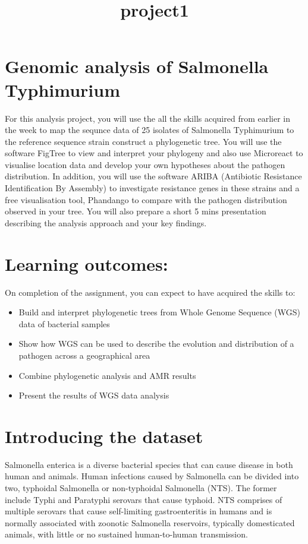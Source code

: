 \documentclass[11pt]{article}
\title{project1}
\providecommand{\tightlist}{%
      \setlength{\itemsep}{0pt}\setlength{\parskip}{0pt}}
\begin{document}
    \hypertarget{genomic-analysis-of-salmonella-typhimurium}{%
\section{Genomic analysis of Salmonella
Typhimurium}\label{genomic-analysis-of-salmonella-typhimurium}}

For this analysis project, you will use the all the skills acquired from
earlier in the week to map the sequnce data of 25 isolates of Salmonella
Typhimurium to the reference sequence strain construct a phylogenetic
tree. You will use the software FigTree to view and interpret your
phylogeny and also use Microreact to visualise location data and develop
your own hypotheses about the pathogen distribution. In addition, you
will use the software ARIBA (Antibiotic Resistance Identification By
Assembly) to investigate resistance genes in these strains and a free
visualisation tool, Phandango to compare with the pathogen distribution
observed in your tree. You will also prepare a short 5 mins presentation
describing the analysis approach and your key findings.

    \hypertarget{learning-outcomes}{%
\section{Learning outcomes:}\label{learning-outcomes}}

On completion of the assignment, you can expect to have acquired the
skills to:

\begin{itemize}
\tightlist
\item
  Build and interpret phylogenetic trees from Whole Genome Sequence
  (WGS) data of bacterial samples
\item
  Show how WGS can be used to describe the evolution and distribution of
  a pathogen across a geographical area
\item
  Combine phylogenetic analysis and AMR results
\item
  Present the results of WGS data analysis
\end{itemize}

    \hypertarget{introducing-the-dataset}{%
\section{Introducing the dataset}\label{introducing-the-dataset}}

Salmonella enterica is a diverse bacterial species that can cause
disease in both human and animals. Human infections caused by Salmonella
can be divided into two, typhoidal Salmonella or non-typhoidal
Salmonella (NTS). The former include Typhi and Paratyphi serovars that
cause typhoid. NTS comprises of multiple serovars that cause
self-limiting gastroenteritis in humans and is normally associated with
zoonotic Salmonella reservoirs, typically domesticated animals, with
little or no sustained human-to-human transmission.
\end{document}
